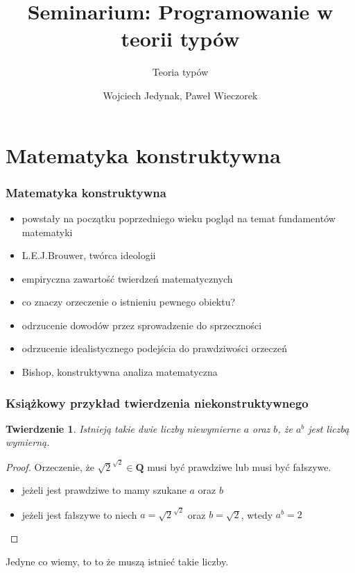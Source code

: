\documentclass{beamer}
\title{Seminarium: Programowanie w teorii typów}
\subtitle{Teoria typów}
\author{Wojciech Jedynak, Paweł Wieczorek}
\institute{Instytut Informatyki Uniwersytetu Wrocławskiego}
\newtheorem{thm}{Twierdzenie}
\begin{document}

\maketitle



\section{Matematyka konstruktywna}

\begin{frame}
\frametitle{Matematyka konstruktywna}

\begin{itemize}
 \item powstały na początku poprzedniego wieku pogląd na temat fundamentów matematyki
 \item L.E.J.Brouwer, twórca ideologii
 \item empiryczna zawartość twierdzeń matematycznych
 \item co znaczy orzeczenie o istnieniu pewnego obiektu?
 \item odrzucenie dowodów przez sprowadzenie do sprzeczności
 \item odrzucenie idealistycznego podejścia do prawdziwości orzeczeń
 \item Bishop, konstruktywna analiza matematyczna
\end{itemize}


\end{frame}


\begin{frame}
\frametitle{Książkowy przykład twierdzenia niekonstruktywnego}

\begin{thm}
 Istnieją takie dwie liczby niewymierne $a$ oraz $b$, że $a^b$ jest liczbą wymierną.
\end{thm}

\begin{proof}
 Orzeczenie, że $\sqrt{2}^{\sqrt{2}} \in \mathbf{Q}$ musi być prawdziwe lub musi być fałszywe.
\begin{itemize}
 \item jeżeli jest prawdziwe to mamy szukane $a$ oraz $b$
 \item jeżeli jest fałszywe to niech $a = \sqrt{2}^{\sqrt{2}}$ oraz $b = \sqrt{2}$, wtedy $a^b = 2$
\end{itemize}

\end{proof}

Jedyne co wiemy, to to że muszą istnieć takie liczby. 

\end{frame}
\end{document}
